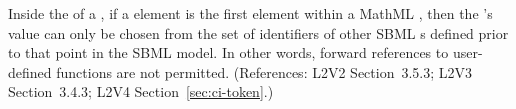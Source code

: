 Inside the  of a \FunctionDefinition, if a
 element is the first element within a MathML
, then the 's value can only be chosen from
the set of identifiers of other SBML \FunctionDefinition{}s
defined prior to that point in the SBML model.  In other words,
forward references to user-defined functions are not permitted.
(References: L2V2 Section~3.5.3; L2V3
Section~3.4.3; L2V4 Section~\ref{sec:ci-token}.)
